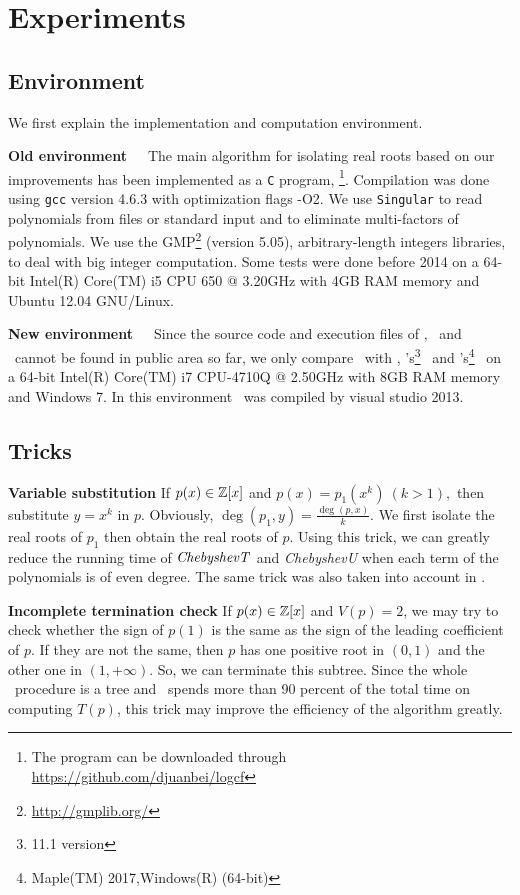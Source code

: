 
\section{Experiments}
\label{sec:exp}

\subsection{Environment}
We first explain the implementation and computation environment.

{\bf Old environment}\ \ \
The main algorithm for isolating real roots based on our improvements has been implemented as a \texttt{C} program, \froot \footnote{The program can be downloaded through \url{https://github.com/djuanbei/logcf}}. Compilation was done using {\tt gcc} version 4.6.3 with optimization flags -O2.
We use {\tt Singular} \cite{singular} to read polynomials from files or standard input and to eliminate multi-factors of polynomials. We use the GMP\footnote{ \url{http://gmplib.org/}}
(version 5.05), arbitrary-length integers libraries, to deal with big integer computation.
Some tests were done before 2014   on a 64-bit Intel(R) Core(TM) i5 CPU 650 @ 3.20GHz with 4GB RAM memory and Ubuntu 12.04 GNU/Linux.

{\bf New environment}\ \ \
Since the source code and execution files
	of    \eign, \cf\ and \sle\  cannot be found in public area so far, we only compare \froot\ with \AND, \MM's\footnote{11.1 version} \inte\  and  \MAPLE's\footnote{Maple(TM) 2017,Windows(R) (64-bit)} \REALROOT\  on   a 64-bit Intel(R) Core(TM) i7 CPU-4710Q @ 2.50GHz with 8GB RAM memory and Windows 7. In this environment \froot\ was compiled by visual studio 2013.

\subsection{Tricks}
{\bf Variable substitution}
If $p(x)\in {\mathbb Z}[x]$ and $p(x)=p_1(x^k)\ (k>1),$ then substitute $y=x^k$ in $p$. Obviously, $\deg(p_1,y)=\frac{\deg(p,x)}{k}$. We first isolate the real roots of $p_1$ then
obtain the real roots of $p$. Using this trick, we can greatly reduce the running time of ${\it ChebyshevT}$
and {\it ChebyshevU} when each term of the polynomials is of even degree. The same trick was also taken into account in \cite{johnson06}.

{\bf Incomplete termination check}
If $p(x)\in {\mathbb Z}[x]$ and $V(p)= 2$, we may try to check whether the sign of $p(1)$ is the same as the sign of the leading coefficient of $p$. If they are not the same, then $p$  has one positive root in $(0,1)$ and the other one in $(1,+\infty)$. So, we can terminate this subtree. Since the whole \froot\ procedure is a tree and \froot\ spends more than 90 percent of the
total time on computing $T(p)$, this trick may improve the efficiency of the algorithm greatly.

